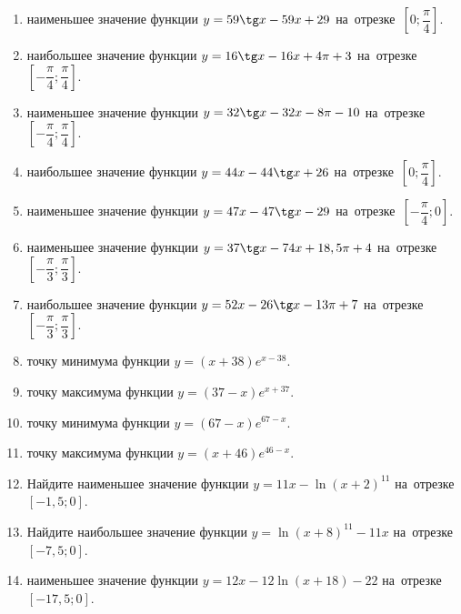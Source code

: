 \documentclass[a4paper,10pt]{article}
\begin{document}
\begin{enumerate}
\item {} наименьшее значение функции $y = 59\tg x-59x+29$ на~отрезке~$\left[0;\dfrac{\pi }{4}\right]$.

\item {} наибольшее значение функции $y=16\tg x-16x+4\pi +3$ на~отрезке~$\left[-\dfrac{\pi }{4};\dfrac{\pi }{4}\right]$.

\item {} наименьшее значение функции $y=32\tg x-32x-8\pi -10$ на~отрезке~$\left[-\dfrac{\pi }{4};\dfrac{\pi }{4}\right]$.

\item {} наибольшее значение функции $y = 44x-44\tg x +26$ на~отрезке~$\left[0;\dfrac{\pi }{4}\right]$.

\item {} наименьшее значение функции $y = 47x-47\tg x -29$ на~отрезке~$\left[-\dfrac{\pi }{4};0\right]$.

\item {} наименьшее значение функции $y = 37\tg x-74x+18,5 \pi +4$ на~отрезке~$\left[-\dfrac{\pi }{3};\dfrac{\pi }{3}\right]$.

\item {} наибольшее значение функции $y = 52x-26\tg x-13\pi +7$ на~отрезке~$\left[-\dfrac{\pi }{3};\dfrac{\pi }{3}\right]$.

\item {} точку минимума функции $y = \left(x+38\right)e^{x-38}$.

\item {} точку максимума функции $y = \left(37-x\right)e^{x+37}$.

\item {} точку минимума функции $y = \left(67-x\right)e^{67-x}$.

\item {} точку максимума функции $y = \left(x+46\right)e^{46-x}$.

\item Найдите наименьшее значение функции $y = 11x-\ln \left(x+2\right)^{11}$ на~отрезке~$\left[-1,5;0\right]$.

\item Найдите наибольшее значение функции $y = \ln \left(x+8\right)^{11}-11x$ на~отрезке~$\left[-7,5;0\right]$.

\item {} наименьшее значение функции $y = 12x-12\ln \left(x+18\right) -22$ на~отрезке~$\left[-17,5;0\right]$.


\end{enumerate}
\end{document}
